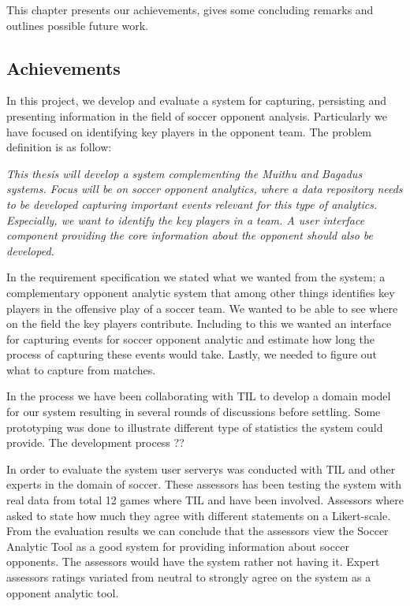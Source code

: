 This chapter presents our achievements, gives some concluding remarks and outlines possible future work.

\subsection{Achievements}
In this project, we develop and evaluate a system for capturing, persisting and presenting information in the field of soccer opponent analysis. Particularly we have focused on identifying key players in the opponent team. The problem definition is as follow:

\textit{This thesis will develop a system complementing the Muithu and Bagadus systems. Focus will be on soccer opponent analytics, where a data repository needs to be developed capturing important events relevant for this type of analytics. Especially, we want to identify the key players in a team. A user interface component providing the core information about the opponent should also be developed.}

In the requirement specification we stated what we wanted from the system; a complementary opponent analytic system that among other things identifies key players in the offensive play of a soccer team. We wanted to be able to see where on the field the key players contribute. Including to this we wanted an interface for capturing events for soccer opponent analytic and estimate how long the process of capturing these events would take. Lastly, we needed to figure out what to capture from matches.

In the process we have been collaborating with \ac{TIL} to develop a domain model for our system resulting in several rounds of discussions before settling. Some prototyping was done to illustrate different type of statistics the system could provide. The development process ??

In order to evaluate the system user serverys was conducted with \ac{TIL} and other experts in the domain of soccer. These assessors has been testing the system with real data from total 12 games where \ac{TIL} and {\SIF} have been involved. Assessors where asked to state how much they agree with different statements on a Likert-scale. From the evaluation results we can conclude that the assessors view the Soccer Analytic Tool as a good system for providing information about soccer opponents. The assessors would have the system rather not having it. Expert assessors ratings variated from neutral to strongly agree on the system as a opponent analytic tool. 

